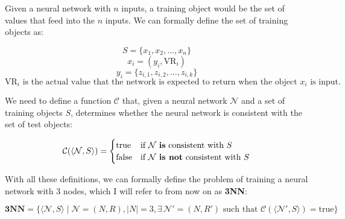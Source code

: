\documentclass[../main]{subfiles}
\begin{document}
Given a neural network with \(n\) inputs, a training object would be the set of values that feed into the \(n\) inputs. We can formally define the set of training objects as:

\begin{equation*}
    S = \{ x_1, x_2, \ldots, x_n \}
\end{equation*}
\begin{equation*}
    x_i = (y_i, \text{VR}_i)
\end{equation*}
\begin{equation*}
    y_i = \{ z_{i,1}, z_{i,2}, \ldots, z_{i,k} \}
\end{equation*}
\begin{equation*}
    \text{VR}_i \text{ is the actual value that the network is expected to return when the object } x_i \text{ is input.}
\end{equation*}

We need to define a function \(\mathcal{C}\) that, given a neural network \(\mathcal{N}\) and a set of training objects \(S\), determines whether the neural network is consistent with the set of test objects:

\begin{equation*}
    \mathcal{C}(\langle \mathcal{N}, S \rangle) = \begin{cases}
  \text{true} & \text{if } \mathcal{N} \text{ \textbf{is} consistent with } S \\
  \text{false} & \text{if } \mathcal{N} \text{ \textbf{is not} consistent with } S
  \end{cases}
\end{equation*}

With all these definitions, we can formally define the problem of training a neural network with 3 nodes, which I will refer to from now on as \textbf{3NN}:

\begin{equation*}
    \textbf{3NN} = \{ \langle \mathcal{N}, S \rangle \mid \mathcal{N} = (N, R), |N| = 3, \exists \, \mathcal{N}' = (N, R') \text{ such that } \mathcal{C}(\langle \mathcal{N}', S \rangle) = \text{true} \}
\end{equation*}
\end{document}
